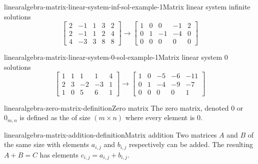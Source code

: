 \documentclass[preview]{standalone}
\begin{document}
\begin{snippetexample}{linearalgebra-matrix-linear-system-inf-sol-example-1}{Matrix linear system infinite solutions}
    \[
        \begin{bmatrix}
            2 & -1 & 1 & 3 & 2 \\
            2 & -1 & 1 & 2 & 4 \\
            4 & -3 & 3 & 8 & 8
        \end{bmatrix}
        \rightarrow
        \begin{bmatrix}
            1 & 0 & 0 & -1 & 2 \\
            0 & 1 & -1 & -4 & 0 \\
            0 & 0 & 0 & 0 & 0
        \end{bmatrix}
    \]
\end{snippetexample}

\begin{snippetexample}{linearalgebra-matrix-linear-system-0-sol-example-1}{Matrix linear system 0 solutions}
    \[
        \begin{bmatrix}
            1 & 1 & 1 & 1 & 4 \\
            2 & 3 & -2 & -3 & 1 \\
            1 & 0 & 5 & 6 & 1
        \end{bmatrix}
        \rightarrow
        \begin{bmatrix}
            1 & 0 & -5 & -6 & -11 \\
            0 & 1 & -4 & -9 & -7 \\
            0 & 0 & 0 & 0 & 1
        \end{bmatrix}
    \]
\end{snippetexample}

\begin{snippetdefinition}{linearalgebra-zero-matrix-definition}{Zero matrix}
    The zero matrix, denoted \(0\) or \(0_{m,n}\)
    is defined as the \matrix of size \((m \times n)\)
    where every element is \(0\).
\end{snippetdefinition}

\begin{snippetdefinition}{linearalgebra-matrix-addition-definition}{Matrix addition}
    Two matrices \(A\) and \(B\) of the same size
    with elements \(a_{i,j}\) and \(b_{i,j}\) respectively
    can be added. The resulting \matrix \(A+B=C\)
    has elements \(c_{i,j} = a_{i,j} + b_{i,j}\).
\end{snippetdefinition}
\end{document}
